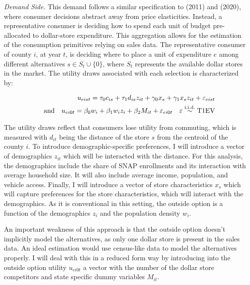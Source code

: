 \documentclass[11.5pt]{article}
\begin{document}
\textit{Demand Side.} %
This demand follows a similar specification to \citeauthor{holmes2011diffusion} (2011) and \citeauthor{ellickson2020measuring} (2020), where consumer decisions abstract away from price elasticities. Instead, a representative consumer is deciding how to spend each unit of budget 
pre-allocated to dollar-store expenditure. This aggregation allows for the estimation of the consumption primitives relying on sales data. The representative consumer of county $i$, at year $t$, is deciding where to place a unit of expenditure $e$ among different alternatives  $s \in S_{t}\cup \{0\}$, where $S_t$ represents the available dollar stores in the market. The utility draws associated with each selection is characterized by:

\begin{align}
    u_{eist} =\tau_0 c_{is} + \tau_1 d_{is} z_{it} + \gamma_0 x_s + \gamma_1 x_s  z_{it} + \varepsilon_{eist} \notag\\  \quad \text{and} \quad  u_{ei0t} = \beta_0 w_i + \beta_1 w_i z_i  + \beta_2 M_{it} + \varepsilon_{ei0t} \quad \varepsilon \overset{\text{i.i.d.}}{\sim} \text{T1EV}
\end{align}

The utility draws reflect that consumers lose utility from commuting, which is measured with $d_{it}$ being the distance of the store $s$ from the centroid of the county $i$. To introduce demographic-specific preferences, I will introduce a vector of demographics $z_{it}$ which will be interacted with the distance. For this analysis, the demographics include the share of SNAP enrollments and its interaction with average household size. It will also include average income, population, and vehicle access. Finally, I will introduce a vector of store characteristics $x_s$ which will capture preferences for the store characteristics, which will interact with the demographics. As it is conventional in this setting, the outside option is a function of the demographics $z_i$ and the population density $w_i$.  

An important weakness of this approach is that the outside option doesn't implicitly model the alternatives, as only one dollar store is present in the sales data. An ideal estimation would use census-like data to model the alternatives properly. I will deal with this in a reduced form way by introducing into the outside option utility $u_{ei0t}$ a vector with the number of the dollar store competitors and state specific dummy variables $M_{it}$. 
\end{document}
